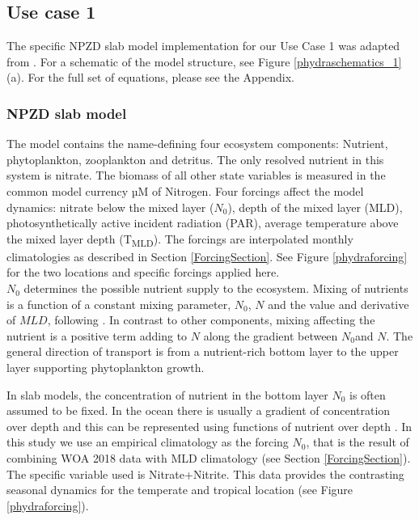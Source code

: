 \documentclass[template.tex]{subfiles}
\begin{document}
\subsection{Use case 1}

The specific NPZD slab model implementation for our Use Case 1 was adapted from \citet{Anderson2015c}. For a schematic of the model structure, see Figure \ref{phydraschematics_1} (a). 
For the full set of equations, please see the Appendix.

\subsubsection{NPZD slab model}
The model contains the name-defining four ecosystem components: Nutrient, phytoplankton, zooplankton and detritus. The only resolved nutrient in this system is nitrate. The biomass of all other state variables is measured in the common model currency \unit{µM} of Nitrogen. Four forcings affect the model dynamics: nitrate below the mixed layer ($N_0$), depth of the mixed layer (MLD), photosynthetically active incident radiation (PAR), average temperature above the mixed layer depth (\unit{T_{MLD}}). The forcings are interpolated monthly climatologies as described in Section \ref{ForcingSection}. See Figure \ref{phydraforcing} for the two locations and specific forcings applied here.\\

$N_0$ determines the possible nutrient supply to the ecosystem. Mixing of nutrients is a function of a constant mixing parameter, $N_0$, $N$ and the value and derivative of $MLD$, following \citet{Evans1985ACycles}. In contrast to other components, mixing affecting the nutrient is a positive term adding to $N$ along the gradient between $N_0$and $N$. The general direction of transport is from a nutrient-rich bottom layer to the upper layer supporting phytoplankton growth.

In slab models, the concentration of nutrient in the bottom layer $N_0$ is often assumed to be fixed. In the ocean there is usually a gradient of concentration over depth and this can be represented using functions of nutrient over depth \citep{Frost1987GrazingSpp., Fasham1995VariationsAnalysis}. In this study we use an empirical climatology as the forcing $N_0$, that is the result of combining WOA 2018 data with MLD climatology (see Section \ref{ForcingSection}). The specific variable used is Nitrate+Nitrite. This data provides the contrasting seasonal dynamics for the temperate and tropical location (see Figure \ref{phydraforcing}).
\end{document}

